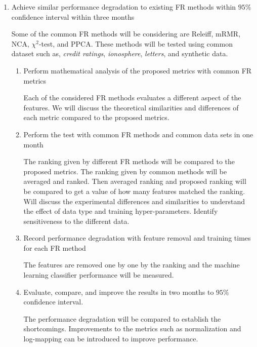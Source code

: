 \begin{enumerate}
    \item Achieve similar performance degradation to existing FR methods within $95\%$ confidence interval within three months
    
    Some of the common FR methods will be considering are Releiff\cite{Kononenko1997}, mRMR\cite{Ding2005}, NCA\cite{Goldberger2005}, $\chi^2$-test, and PPCA\cite{Tipping1999}. These methods will be tested using common dataset such as, \textit{credit ratings}, \textit{ionosphere}, \textit{letters}, and synthetic data.    
    
    
    \begin{enumerate}
        \item Perform mathematical analysis of the proposed metrics with common FR metrics
        
        Each of the considered FR methods evaluates a different aspect of the features. We will discuss the theoretical similarities and differences of each metric compared to the proposed metrics.
        
        \item Perform the test with common FR methods and common data sets in one month
        
        The ranking given by different FR methods will be compared to the proposed metrics. The ranking given by common methods will be averaged and ranked. Then averaged ranking and proposed ranking will be compared to get a value of how many features matched the ranking.  Will discuss the experimental differences and similarities to understand the effect of data type and training hyper-parameters. Identify sensitiveness to the different data.
        
        \item Record performance degradation with feature removal and training times for each FR method
        
        The features are removed one by one by the ranking and the machine learning classifier performance will be measured. 
        
        \item Evaluate, compare, and improve the results in two months to $95\%$ confidence interval.
        
        The performance degradation will be compared to establish the shortcomings. Improvements to the metrics such as normalization and log-mapping can be introduced to improve performance.
        

\end{enumerate}
\end{enumerate}
